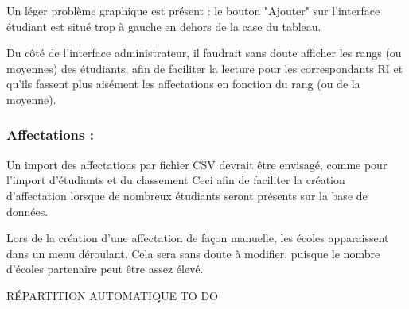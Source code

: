 Un léger problème graphique est présent : le bouton "Ajouter" sur l'interface étudiant est situé trop à gauche en dehors de la case du tableau.

Du côté de l'interface administrateur, il faudrait sans doute afficher les rangs (ou moyennes) des étudiants, afin de faciliter la lecture pour les correspondants RI et qu'ils fassent plus aisément les affectations en fonction du rang (ou de la moyenne).


\subsubsection{Affectations :}
Un import des affectations par fichier CSV devrait être envisagé, comme pour l'import d'étudiants et du classement Ceci afin de faciliter la création d'affectation lorsque de nombreux étudiants seront présents sur la base de données.

Lors de la création d'une affectation de façon manuelle, les écoles apparaissent dans un menu déroulant. Cela sera sans doute à modifier, puisque le nombre d'écoles partenaire peut être assez élevé.

RÉPARTITION AUTOMATIQUE TO DO

